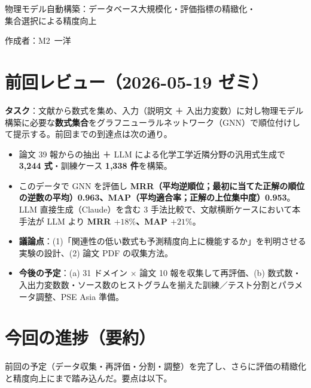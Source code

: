 \documentclass[11pt,a4paper]{ltjsarticle}
\begin{document}
\begin{center}
{\sffamily\large 物理モデル自動構築：データベース大規模化・評価指標の精緻化・\\集合選択による精度向上}
\end{center}
\vspace{0.3em}
\hfill 作成者：M2\ 一洋
\vspace{0.8em}

\section{前回レビュー（2026-05-19 ゼミ）}
\textbf{タスク}：文献から数式を集め、入力（説明文 ＋ 入出力変数）に対し物理モデル構築に必要な\textbf{数式集合}をグラフニューラルネットワーク（GNN）で順位付けして提示する。前回までの到達点は次の通り。

\begin{itemize}[leftmargin=1.5em]
  \item 論文 39 報からの抽出 ＋ LLM による化学工学近隣分野の汎用式生成で \textbf{3{,}244 式}・訓練ケース \textbf{1{,}338 件}を構築。
  \item このデータで GNN を評価し \textbf{MRR（平均逆順位；最初に当てた正解の順位の逆数の平均）0.963、MAP（平均適合率；正解の上位集中度）0.953}。LLM 直接生成（Claude）を含む 3 手法比較で、文献横断ケースにおいて本手法が LLM より \textbf{MRR $+18\%$、MAP $+21\%$}。
  \item \textbf{議論点}：(1)「関連性の低い数式も予測精度向上に機能するか」を判明させる実験の設計、(2) 論文 PDF の収集方法。
  \item \textbf{今後の予定}：(a) 31 ドメイン $\times$ 論文 10 報を収集して再評価、(b) 数式数・入出力変数数・ソース数のヒストグラムを揃えた訓練／テスト分割とパラメータ調整、PSE Asia 準備。
\end{itemize}

\section{今回の進捗（要約）}
前回の予定（データ収集・再評価・分割・調整）を完了し、さらに評価の精緻化と精度向上にまで踏み込んだ。要点は以下。
\end{document}
